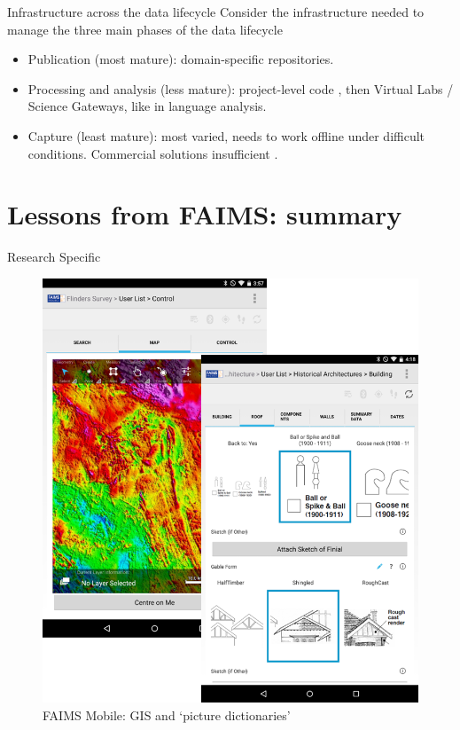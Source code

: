 \documentclass[aspectratio=169, 12pt]{beamer} %
\begin{document}
\begin{frame}{Infrastructure across the data lifecycle}
    Consider the infrastructure needed to manage the three main phases of the data lifecycle
    \begin{itemize}[label=\textbullet]
        \item Publication (most mature): domain-specific repositories.
        \item Processing and analysis (less mature): project-level code \cite{Stewart_Lowndes2017-lj}, then Virtual Labs / Science Gateways, like \cite{Alveo2019-tk} in language analysis.
        \item Capture (least mature): most varied, needs to work offline under difficult conditions. Commercial solutions insufficient \cite{Bureau_of_Reclamation2017-xl}.
    \end{itemize}
\end{frame}



\section{Lessons from FAIMS: summary}

\begin{frame}{Research Specific}
 \begin{figure}[H]
    \centering
        \includegraphics[height=.75\textheight]{figures/FAIMS-screenshots.png}
        \caption{FAIMS Mobile: GIS and `picture dictionaries'}
        \label{fig:FAIMS-mobile-screenshots}
 \end{figure}
\end{frame}
\end{document}
